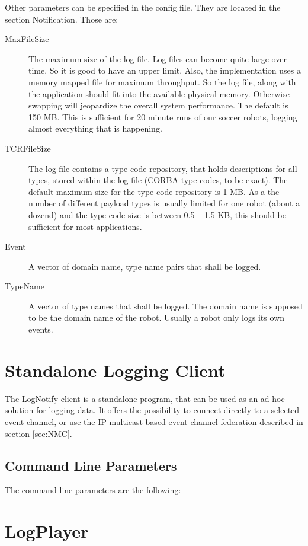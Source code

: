 Other parameters can be specified in the config file. They are located
in the section Notification. Those are:
\begin{description}
\item[MaxFileSize] The maximum size of the log file. Log files can become
  quite large over time. So it is good to have an upper limit. Also,
  the implementation uses a memory mapped file for maximum throughput.
  So the log file, along with the application should fit into the
  available physical memory. Otherwise swapping will jeopardize the
  overall system performance. The default is 150 MB. This is
  sufficient for 20 minute runs of our soccer robots, logging almost
  everything that is happening.
\item[TCRFileSize] The log file contains a type code repository, that
  holds descriptions for all types, stored within the log file (CORBA
  type codes, to be exact). The default maximum size for the type code
  repository is 1 MB. As a the number of different payload types is
  usually limited for one robot (about a dozend) and the type code
  size is between 0.5 -- 1.5 KB, this should be sufficient for most
  applications.
\item[Event] A vector of domain name, type name pairs that shall be logged.
\item[TypeName] A vector of type names that shall be logged. The
  domain name is supposed to be the domain name of the robot. Usually
  a robot only logs its own events.
\end{description}

\section{Standalone Logging Client}

The LogNotify client is a standalone program, that can be used as an
ad hoc solution for logging data. It offers the possibility to connect
directly to a selected event channel, or use the IP-multicast based
event channel federation described in section \ref{sec:NMC}.

\subsection{Command Line Parameters}

The command line parameters are the following:

\section{LogPlayer}

